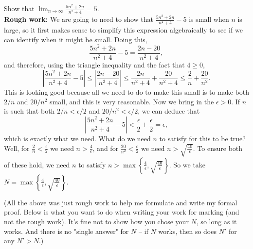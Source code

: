 \documentclass[11pt,dvipsnames]{book}
\numberwithin{equation}{section} %
\numberwithin{figure}{section} %
\numberwithin{table}{section} %
\begin{document}
\begin{example}
Show that $\lim_{n\rightarrow \infty} \frac{5n^2+2n}{n^2+4}=5$. \\
%
%

{\bf Rough work:} We are going to need to show that $ \frac{5n^2+2n}{n^2+4}-5$ is small when $n$ is large, so it first makes sense to simplify this expression algebraically to see if we can identify when it might be small. Doing this,
\[\frac{5n^2+2n}{n^2+4}-5 =\frac{2n-20}{n^2+4},
\]
and therefore, using the triangle inequality and the fact that $4\geq0$,
\[\left|\frac{5n^2+2n}{n^2+4}-5\right|
\leq \left| \frac{2n-20}{n^2+4} \right| 
\leq \frac{2n}{n^2 + 4} + \frac{20}{n^2 + 4}
\leq \frac{2}{n} + \frac{20}{n^2}.
\]
This is looking good because all we need to do to make this small is to make both $2/n$ and $20/n^2$ small, and this is very reasonable. Now we bring in the $\epsilon > 0$. If $n$ is such that both $2/n < \epsilon/2$ and $20/n^2 < \epsilon/2$, we can deduce that 
\[\left|\frac{5n^2+2n}{n^2+4}-5\right| < \frac{\epsilon}{2}+ \frac{\epsilon}{2} = \epsilon,
\]
which is exactly what we need. What do we need $n$ to satisfy for this to be true? Well, for $\frac{2}{n} < \frac{\epsilon}{2}$ we need $n > \frac{4}{\epsilon}$, and for $\frac{20}{n^2} < \frac{\epsilon}{2}$ we need $n > \sqrt{\frac{40}{\epsilon}}$. To ensure both of these hold, we need $n$ to satisfy $n > \max\left\{\frac{4}{\epsilon}, \sqrt{\frac{40}{\epsilon}}\right\}.$ So we take $N = \max\left\{\frac{4}{\epsilon}, \sqrt{\frac{40}{\epsilon}}\right\}.$ 

(All the above was just rough work to help me formulate and write my formal proof. Below is what you want to do when writing your work for marking (and not the rough work). It's fine not to show how you chose your $N$, so long as it works. And there is no "single answer" for $N$ -- if $N$ works, then so does $N'$ for any $N'>N$.)\\


\end{example}
\end{document}
